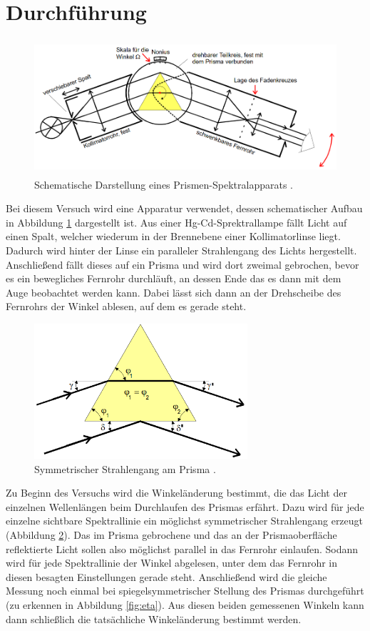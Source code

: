 \section{Durchführung}
\label{sec:Durchführung}

\begin{figure}[H]
  \centering
  \includegraphics[height=5cm]{Aufbau.PNG}
  \caption{Schematische Darstellung eines Prismen-Spektralapparats \cite{sample}.}
  \label{fig:aufbau}
\end{figure}

Bei diesem Versuch wird eine Apparatur verwendet, dessen schematischer Aufbau in Abbildung \ref{fig:aufbau}
dargestellt ist. Aus einer Hg-Cd-Sprektrallampe fällt Licht auf einen Spalt, welcher wiederum in der Brennebene
einer Kollimatorlinse liegt. Dadurch wird hinter der Linse ein paralleler Strahlengang des Lichts hergestellt.
Anschließend fällt dieses auf ein Prisma und wird dort zweimal gebrochen, bevor es ein bewegliches Fernrohr
durchläuft, an dessen Ende das es dann mit dem Auge beobachtet werden kann. Dabei lässt sich dann
an der Drehscheibe des Fernrohrs der Winkel ablesen, auf dem es gerade steht.

\begin{figure}[H]
  \centering
  \includegraphics[height=5cm]{Brechung.PNG}
  \caption{Symmetrischer Strahlengang am Prisma \cite{sample}.}
  \label{fig:brechung}
\end{figure}

Zu Beginn des Versuchs wird die Winkeländerung bestimmt, die das Licht der einzelnen Wellenlängen beim Durchlaufen des Prismas
erfährt. Dazu wird für jede einzelne sichtbare Spektrallinie ein möglichst symmetrischer Strahlengang erzeugt (Abbildung \ref{fig:brechung}).
Das im Prisma gebrochene und das an der Prismaoberfläche reflektierte Licht sollen also möglichst parallel in das Fernrohr einlaufen.
Sodann wird für jede Spektrallinie der Winkel abgelesen, unter dem das Fernrohr in diesen besagten Einstellungen gerade steht.
Anschließend wird die gleiche Messung noch einmal bei spiegelsymmetrischer Stellung des Prismas durchgeführt (zu erkennen in Abbildung \ref{fig:eta}).
Aus diesen beiden gemessenen Winkeln kann dann schließlich die tatsächliche Winkeländerung bestimmt werden.

